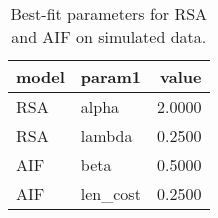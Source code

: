 \begin{table}[!ht]
\centering
\begin{table}
\caption{Best-fit parameters for RSA and AIF on simulated data.}
\label{tab:fig14}
\begin{tabular}{llr}
\toprule
model & param1 & value \\
\midrule
RSA & alpha & 2.0000 \\
RSA & lambda & 0.2500 \\
AIF & beta & 0.5000 \\
AIF & len\_cost & 0.2500 \\
\bottomrule
\end{tabular}
\end{table}
\end{table}
